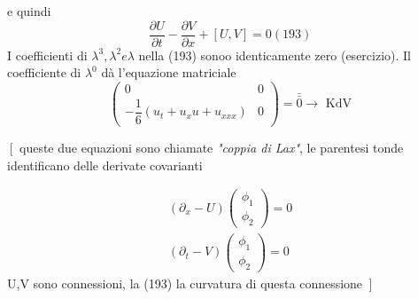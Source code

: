 \documentclass[a4paper,11pt]{report}
\begin{document}
e quindi
\begin{equation}
\dfrac{\partial U}{\partial t} - \dfrac{\partial V}{\partial x} + \left[U,V\right]=0(193)
\end{equation}
I coefficienti di $\lambda^3,\lambda^2 e \lambda$ nella (193) sonoo identicamente zero (esercizio). Il coefficiente di $\lambda^0$ dà l'equazione matriciale
$$
\left(\begin{matrix}
0 & 0 \\
-\dfrac{1}{6}\left(u_t + u_x u + u_{xxx}\right) & 0
\end{matrix} \right) = \bar{\bar{0}} \rightarrow \text{ KdV}
$$

$\left[\right.$ queste due equazioni sono chiamate \emph{"coppia di Lax"}, le parentesi tonde identificano delle derivate covarianti

$$
\begin{matrix}
\left(\partial_x - U \right)\left(\begin{matrix}
\phi_1 \\
\phi_2
\end{matrix} \right) =0 \\
\left(\partial_t - V \right)\left(\begin{matrix}
\phi_1 \\
\phi_2
\end{matrix} \right) = 0
\end{matrix}
$$
U,V sono connessioni, la (193) la curvatura di questa connessione
$\left.\right]$
\end{document}
